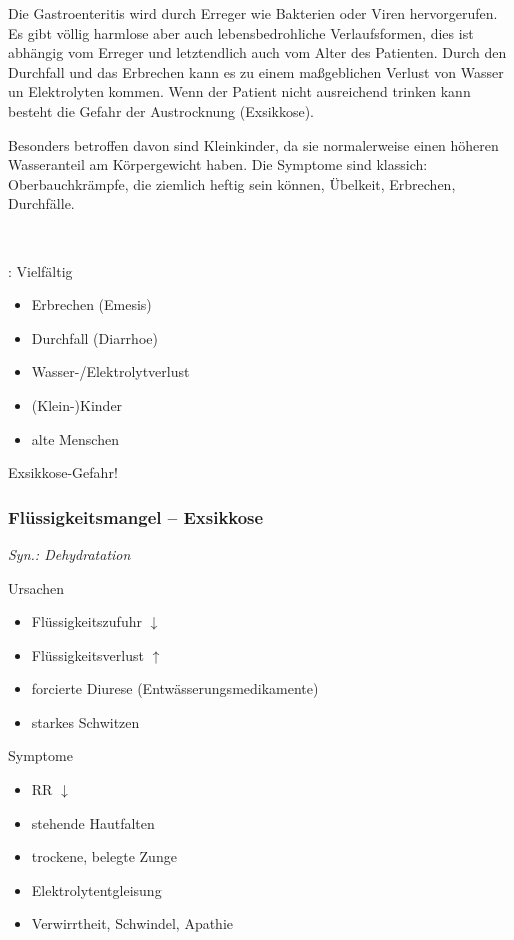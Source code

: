 \gMarried
{Die Gastroenteritis wird durch Erreger
wie Bakterien oder Viren hervorgerufen. Es gibt völlig
harmlose aber auch lebensbedrohliche Verlaufsformen, dies ist abhängig vom Erreger und
letztendlich auch vom Alter des Patienten. Durch den
Durchfall und das Erbrechen kann es zu einem maßgeblichen Verlust von Wasser un Elektrolyten
kommen. Wenn der Patient
nicht ausreichend trinken kann besteht die Gefahr der Austrocknung (Exsikkose).

Besonders betroffen davon sind Kleinkinder, da sie
normalerweise einen höheren Wasseranteil am Körpergewicht
haben.  Die Symptome sind klassich: Oberbauchkrämpfe,
die ziemlich heftig sein können, Übelkeit, Erbrechen, Durchfälle.
}{~

: Vielfältig


\begin{itemize}
\item Erbrechen (Emesis)
\item Durchfall (Diarrhoe)
\item Wasser-/Elektrolytverlust
\end{itemize}


\begin{itemize}
\item (Klein-)Kinder
\item alte Menschen
\end{itemize}

Exsikkose-Gefahr!}






\subsubsection{Flüssigkeitsmangel -- Exsikkose}

\emph{Syn.: Dehydratation}

\gMarried
{}
{Ursachen
\begin{itemize}
\item Fl\"ussigkeitszufuhr ${\downarrow}$
\item Fl\"ussigkeitsverlust ${\uparrow}$
\item forcierte Diurese  (Entwässerungsmedikamente)
\item starkes Schwitzen
\end{itemize}
Symptome
\begin{itemize}
\item RR ${\downarrow}$
\item stehende Hautfalten
\item trockene, belegte Zunge
\item Elektrolytentgleisung
\item Verwirrtheit, Schwindel, Apathie
\end{itemize}}



